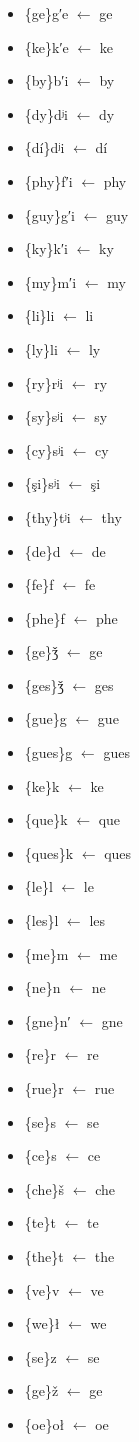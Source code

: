 \documentclass{article}
\begin{document}
\begin{multicols}{3}
\begin{itemize}
\item \{ge\}g′e $\leftarrow$ ge
\item \{ke\}k′e $\leftarrow$ ke
\item \{by\}b′i $\leftarrow$ by
\item \{dy\}dʲi $\leftarrow$ dy
\item \{dí\}dʲi $\leftarrow$ dí
\item \{phy\}f′i $\leftarrow$ phy
\item \{guy\}g′i $\leftarrow$ guy
\item \{ky\}k′i $\leftarrow$ ky
\item \{my\}m′i $\leftarrow$ my
\item \{li\}li $\leftarrow$ li
\item \{ly\}li $\leftarrow$ ly
\item \{ry\}rʲi $\leftarrow$ ry
\item \{sy\}sʲi $\leftarrow$ sy
\item \{cy\}sʲi $\leftarrow$ cy
\item \{şi\}sʲi $\leftarrow$ şi
\item \{thy\}tʲi $\leftarrow$ thy
\item \{de\}d $\leftarrow$ de
\item \{fe\}f $\leftarrow$ fe
\item \{phe\}f $\leftarrow$ phe
\item \{ge\}ǯ $\leftarrow$ ge
\item \{ges\}ǯ $\leftarrow$ ges
\item \{gue\}g $\leftarrow$ gue
\item \{gues\}g $\leftarrow$ gues
\item \{ke\}k $\leftarrow$ ke
\item \{que\}k $\leftarrow$ que
\item \{ques\}k $\leftarrow$ ques
\item \{le\}l $\leftarrow$ le
\item \{les\}l $\leftarrow$ les
\item \{me\}m $\leftarrow$ me
\item \{ne\}n $\leftarrow$ ne
\item \{gne\}n′ $\leftarrow$ gne
\item \{re\}r $\leftarrow$ re
\item \{rue\}r $\leftarrow$ rue
\item \{se\}s $\leftarrow$ se
\item \{ce\}s $\leftarrow$ ce
\item \{che\}š $\leftarrow$ che
\item \{te\}t $\leftarrow$ te
\item \{the\}t $\leftarrow$ the
\item \{ve\}v $\leftarrow$ ve
\item \{we\}ł $\leftarrow$ we
\item \{se\}z $\leftarrow$ se
\item \{ge\}ž $\leftarrow$ ge
\item \{oe\}oł $\leftarrow$ oe
\end{itemize}\end{multicols}
\end{document}

